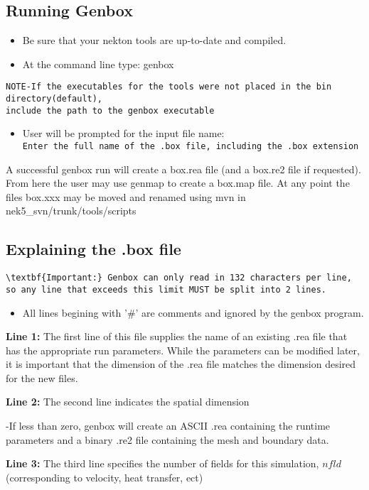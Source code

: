 \subsection{ Running Genbox}
\begin{itemize}
  \item Be sure that your nekton tools are up-to-date and compiled.
  \item At the command line type: genbox
\end{itemize}
\begin{verbatim}NOTE-If the executables for the tools were not placed in the bin directory(default), 
include the path to the genbox executable
\end{verbatim}
\begin{itemize}
  \item User will be prompted for the input file name: \\
    \texttt{Enter the full name of the .box file, including the .box extension}
\end{itemize}
A successful genbox run will create a box.rea file (and a box.re2 file if requested).  From here the user may use genmap to create a box.map file.  At any point the files box.xxx may be moved and renamed using mvn in nek5\_svn/trunk/tools/scripts

\subsection{ Explaining the .box file}
\begin{verbatim}\textbf{Important:} Genbox can only read in 132 characters per line, so any line that exceeds this limit MUST be split into 2 lines.  
\end{verbatim}
\begin{itemize}
  \item All lines begining with '\#' are comments and ignored by the genbox program.
  \end{itemize}
  \par \textbf{Line 1:} The first line of this file supplies the name of an existing .rea file that has the appropriate run parameters.  While the parameters can be modified later, it is important that the dimension of the .rea file matches the dimension desired for the new files.
  \par \textbf{Line 2:} The second line indicates the spatial dimension

  \begin{description}-If less than zero, genbox will create an ASCII .rea containing the runtime parameters and a binary .re2 file containing the mesh and boundary data.
  \end{description}
  \par \textbf{Line 3:} The third line specifies the number of fields for this simulation, $nfld$  (corresponding to velocity, heat transfer, ect)

